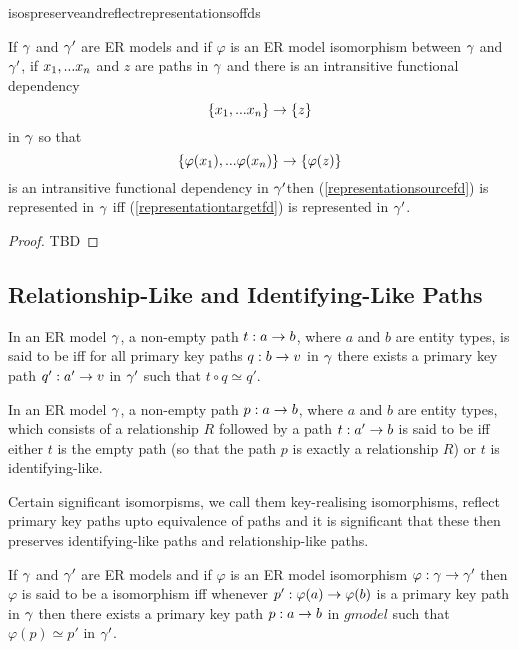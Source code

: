isospreserveandreflectrepresentationsoffds
\begin{lemma}
\label{isospreserveandreflectrepresentationsoffds}
If $\gamma$ and $\gamma'$ are ER models and  if  $\varphi$ is an ER model isomorphism between $\gamma$  and $\gamma'$,  if $x_1,...x_n$ and $z$ are paths in $\gamma$
and there is an  intransitive functional dependency
\begin{equation}
\label{representationsourcefd}
\left\{x_1,...x_n\right\} \rightarrow \left\{z\right\}
\end{equation} 
in $\gamma$
so that
\begin{equation}
\label{representationtargetfd}
\left\{\varphi(x_1),...\varphi(x_n)\right\} \rightarrow \left\{\varphi(z)\right\}
\end{equation}
is an intransitive  functional dependency in $\gamma'$then
(\ref{representationsourcefd}) is represented in $\gamma$ iff
(\ref{representationtargetfd}) is represented in $\gamma'$.
\end{lemma}
\begin{proof}
TBD
\end{proof}

\subsection{Relationship-Like and Identifying-Like Paths}

\begin{definition}
In an ER model $\gamma$, a non-empty path $t: a \rightarrow b$, where $a$ and $b$ are entity types, is said to be  iff  for all primary key paths $q:b \rightarrow v$ in $\gamma$ there exists a primary key path $q':a' \rightarrow v$ in $\gamma'$ such that $t \circ q \simeq q'$.
\end{definition}

\begin{definition}
In an ER model $\gamma$, a non-empty path $p: a \rightarrow b$, where $a$ and $b$ are entity types, which consists
of a relationship $R$ followed by a  path $t :a' \rightarrow b$ is said to be  iff
either  $t$ is the empty path (so that the path $p$ is exactly a relationship $R$) or $t$
is identifying-like.
\end{definition}

Certain significant isomorpisms, we call them key-realising isomorphisms, reflect primary key paths upto equivalence of paths and it is significant that these then preserves identifying-like paths and  relationship-like paths. 

\begin{definition}
If $\gamma$ and $\gamma'$ are ER models and if $\varphi$ is an ER model isomorphism 
$\varphi: \gamma  \rightarrow \gamma'$ then $\varphi$ is said to be a  isomorphism iff
whenever $p':\varphi(a) \rightarrow \varphi(b)$ is a primary key path in $\gamma$ then there exists 
a primary key path $p:a \rightarrow b$ in $gmodel$ such that $\varphi(p) \simeq p'$ in $\gamma'$.
\end{definition} 


